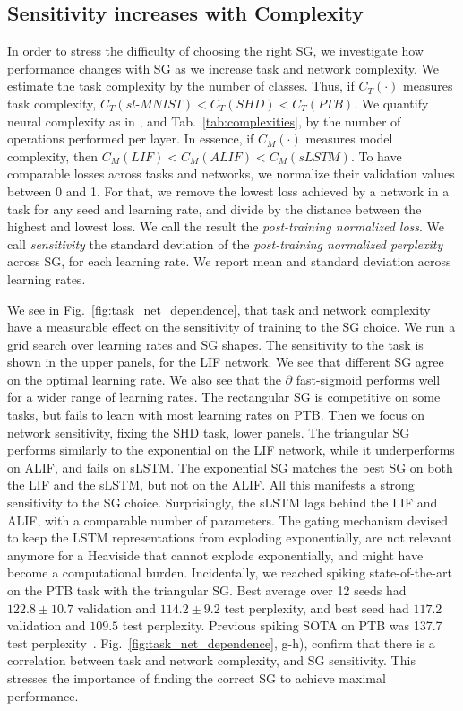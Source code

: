\subsection{Sensitivity increases with Complexity}
\label{sec:sensitivity}


In order to stress the difficulty of choosing the right SG, we investigate how performance changes with SG as we increase task and network complexity. We estimate the task complexity by the number of classes. Thus, if $C_T(\cdot)$ measures task complexity, $C_T(sl\text{-}MNIST)<C_T(SHD)<C_T(PTB)$. We quantify neural complexity as in \cite{yin2021accurate}, and Tab.~\ref{tab:complexities}, by the number of operations performed per layer. In essence, if $C_M(\cdot)$ measures model complexity, then $C_M(LIF)<C_M(ALIF)<C_M(sLSTM)$. To have comparable losses across tasks and networks, we normalize their validation values between 0 and 1. For that, we remove the lowest loss achieved by a network in a task for any seed and learning rate, and divide by the distance between the highest and lowest loss. We call the result the \textit{post-training normalized loss}. We call \textit{sensitivity} the standard deviation of the \textit{post-training normalized perplexity} across SG, for each learning rate. We report mean and standard deviation across learning rates.


We see in Fig.~\ref{fig:task_net_dependence}, that task and network complexity have a measurable effect on the sensitivity of training to the SG choice.  We run a grid search over learning rates and SG shapes. The sensitivity to the task is shown in the upper panels, for the LIF network. We see that different SG agree on the optimal learning rate. We also see that the $\partial$ fast-sigmoid performs well for a wider range of learning rates. The rectangular SG is competitive on some tasks, but fails to learn with most learning rates on PTB. Then we focus on network sensitivity, fixing the SHD task, lower panels. The triangular SG performs similarly to the exponential on the LIF network, while it underperforms on ALIF, and fails on sLSTM. The exponential SG matches the best SG on both the LIF and the sLSTM, but not on the ALIF. All this manifests a strong sensitivity to the SG choice. 
Surprisingly, the sLSTM lags behind the LIF and ALIF, with a comparable number of parameters. The gating mechanism devised to keep the LSTM representations from exploding exponentially, are not relevant anymore for a Heaviside that cannot explode exponentially, and might have become a computational burden. 
Incidentally, we reached spiking state-of-the-art on the PTB task with the triangular SG. Best average over 12 seeds had $122.8 \pm 10.7$ validation and $114.2 \pm 9.2$ test perplexity, and best seed had $117.2$ validation and $109.5$ test perplexity. Previous spiking SOTA on PTB was 137.7 test perplexity~\cite{wozniak2020deep}.  Fig.~\ref{fig:task_net_dependence}, g-h), confirm that there is a correlation between task and network complexity, and SG sensitivity. This stresses the importance of finding the correct SG to achieve maximal performance.




